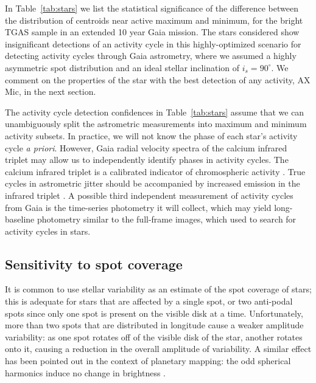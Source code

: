 In Table~\ref{tab:stars} we list the statistical significance of the difference between the distribution of centroids near active maximum and minimum, for the bright TGAS sample in an extended 10 year Gaia mission. The stars considered show insignificant detections of an activity cycle in this highly-optimized scenario for detecting activity cycles through Gaia astrometry, where we assumed a highly asymmetric spot distribution and an ideal stellar inclination of $i_s = 90^\circ$. We comment on the properties of the star with the best detection of any activity, AX Mic, in the next section.

The activity cycle detection confidences in Table~\ref{tab:stars} assume that we can unambiguously split the astrometric measurements into maximum and minimum activity subsets. In practice, we will not know the phase of each star's activity cycle \textit{a priori}. However, Gaia radial velocity spectra of the calcium infrared triplet may allow us to independently identify phases in activity cycles. The calcium infrared triplet is a calibrated indicator of chromospheric activity \citep[see e.g.:][]{Chmielewski2000, Cenarro2001, Cauzzi2008, Zerjal2013, BoroSaikia2016, Robertson2016, Martin2017}. True cycles in astrometric jitter should be accompanied by increased emission in the infrared triplet \citep{Andretta2005, Busa2007}. A possible third independent measurement of activity cycles from Gaia is the time-series photometry it will collect, which may yield long-baseline photometry similar to the \kepler full-frame images, which \citet{montet2017} used to search for activity cycles in \kepler stars.

\subsection{Sensitivity to spot coverage}

It is common to use stellar variability as an estimate of the spot coverage
of stars;  this is adequate for stars that are affected by a single spot,
or two anti-podal spots since only one spot is present on the visible disk
at a time.  Unfortunately, more than two spots that are distributed 
in longitude
cause a weaker amplitude variability:  as one spot rotates off of the
visible disk of the star, another rotates onto it, causing a reduction in
the overall amplitude of variability.  A similar effect has been pointed
out in the context of planetary mapping:  the odd spherical harmonics
induce no change in brightness \citep{Cowan2008}.

